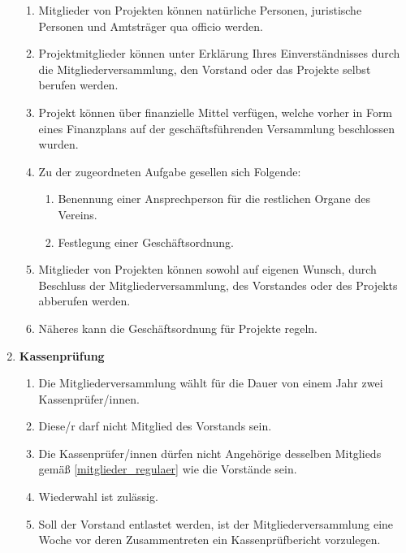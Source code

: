 \documentclass[german]{article}
\newcommand{\paragr}[1]{\item \textsf{\textbf{#1}}}
\begin{document}
\begin{enumerate}
\begin{enumerate}
\item Mitglieder von Projekten können natürliche Personen, juristische Personen und Amtsträger qua officio werden.

\item Projektmitglieder können unter Erklärung Ihres Einverständnisses durch die Mitgliederversammlung, den Vorstand oder das Projekte selbst berufen werden.

\item Projekt können über finanzielle Mittel verfügen, welche vorher in Form eines Finanzplans auf der geschäftsführenden Versammlung beschlossen wurden. 

\item Zu der zugeordneten Aufgabe gesellen sich Folgende:
\begin{enumerate}

\item Benennung einer Ansprechperson für die restlichen Organe des Vereins.

\item Festlegung einer Geschäftsordnung.

\end{enumerate}

\item Mitglieder von Projekten können sowohl auf eigenen Wunsch, durch Beschluss der Mitgliederversammlung, des Vorstandes oder des Projekts abberufen werden.

\item Näheres kann die Geschäftsordnung für Projekte regeln.

\end{enumerate}


\paragr{Kassenprüfung}
\begin{enumerate}

\item Die Mitgliederversammlung wählt für die Dauer von einem Jahr zwei Kassenprüfer/innen.

\item Diese/r darf nicht Mitglied des Vorstands sein.

\item Die Kassenprüfer/innen dürfen nicht Angehörige desselben Mitglieds gemäß \ref{mitglieder_regulaer} wie die Vorstände sein.

\item Wiederwahl ist zulässig.

\item Soll der Vorstand entlastet werden, ist der Mitgliederversammlung eine Woche vor deren Zusammentreten ein Kassenprüfbericht vorzulegen.


\end{enumerate}
\end{enumerate}
\end{document}
